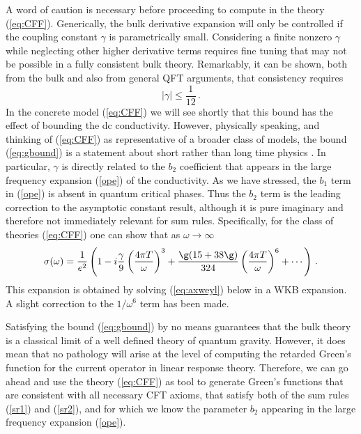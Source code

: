 \documentclass[10pt, oneside]{book}
\def\be{\begin{equation}}
\def\ee{\end{equation}}
\begin{document}
\begin{doublespace}
A word of caution is necessary before proceeding to compute in the theory (\ref{eq:CFF}). Generically, the bulk derivative expansion will only be controlled if the coupling constant $\gamma$ is parametrically small. Considering a finite nonzero $\gamma$ while neglecting other higher derivative terms requires fine tuning that may not be possible in a fully consistent bulk theory. Remarkably, it can be shown, both from the bulk and also from general QFT arguments, that consistency requires \cite{Hofman:2008ar, Hofman:2009ug,Myers:2010pk,Chowdhury:2012km,Hofman:2016awc}
\be\label{eq:gbound}
|\gamma| \leq \frac{1}{12} \,.
\ee
In the concrete model (\ref{eq:CFF}) we will see shortly that this bound has the effect of bounding the dc conductivity. However, physically speaking, and thinking of (\ref{eq:CFF}) as representative of a broader class of models, the bound (\ref{eq:gbound}) is a statement about short rather than long time physics \cite{Hofman:2008ar, Hofman:2009ug,Hofman:2016awc}. In particular, $\gamma$ is directly related to the $b_2$ coefficient that appears in the large frequency expansion (\ref{ope}) of the conductivity. As we have stressed, the $b_1$ term in (\ref{ope}) is absent in quantum critical phases. Thus the $b_2$ term is the leading correction to the asymptotic constant result, although it is  pure imaginary and therefore not immediately relevant for sum rules. Specifically, for the class of theories (\ref{eq:CFF}) one can show that as $\omega \to \infty$ \cite{Witczak-Krempa:2013aea}
\be
\sigma(\omega) = \frac{1}{e^2} \left(1 - i \frac{\gamma}{9} \left(\frac{4 \pi T}{\omega}\right)^3 +  \frac{\g (15 + 38 \g)}{324} \left(\frac{4 \pi T}{\omega}\right)^6 + \cdots \right) \,.
\ee
This expansion is obtained by solving (\ref{eq:axweyl}) below in a WKB expansion. A slight correction to the $1/\omega^6$ term has been made.

Satisfying the bound (\ref{eq:gbound}) by no means guarantees that the bulk theory is a classical limit of a well defined theory of quantum gravity. However, it does mean that no pathology will arise at the level of computing the retarded Green's function for the current operator in linear response theory. Therefore, we can go ahead and use the theory (\ref{eq:CFF}) as tool to generate Green's functions that are consistent with all necessary CFT axioms, that satisfy both of the sum rules (\ref{sr1}) and (\ref{sr2}), and for which we know the parameter $b_2$ appearing in the large frequency expansion (\ref{ope}).


\end{doublespace}
\end{document}
